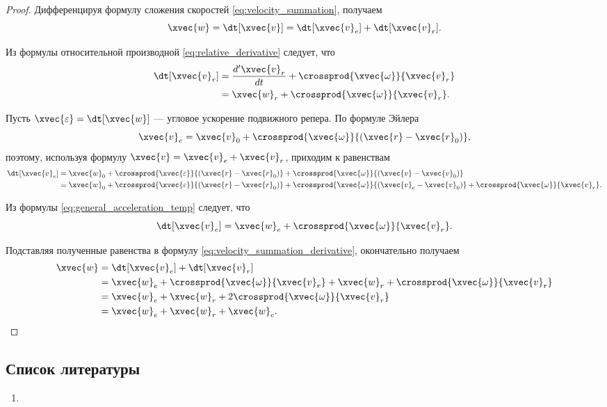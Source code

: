 \begin{proof}
  Дифференцируя формулу сложения скоростей \ref{eq:velocity_summation}, получаем
  \begin{equation}
    \label{eq:velocity_summation_derivative}
    \xvec{w} = \dt[\xvec{v}] = \dt[\xvec{v}_e] + \dt[\xvec{v}_r].
  \end{equation}

  Из формулы относительной производной \ref{eq:relative_derivative} следует, что
  \begin{equation*}
    \begin{aligned}
      \dt[\xvec{v}_r] &= \frac{d' \xvec{v}_r}{dt} +
        \crossprod{\xvec{\omega}}{\xvec{v}_r} \\
      &= \xvec{w}_r + \crossprod{\xvec{\omega}}{\xvec{v}_r}.
    \end{aligned}
  \end{equation*}

  Пусть $\xvec{\varepsilon} = \dt[\xvec{w}]$ --- угловое ускорение подвижного
  репера. По формуле Эйлера
  \begin{equation*}
    \xvec{v}_e = \xvec{v}_0
      + \crossprod
        {\xvec{\omega}}
        {(\xvec{r} - \xvec{r}_0)},
  \end{equation*}
  поэтому, используя формулу $\xvec{v} = \xvec{v}_e + \xvec{v}_r$, приходим к
  равенствам
  \begin{equation*}
    \begin{aligned}
      \dt[\xvec{v}_e] &= \xvec{w}_0
        + \crossprod{\xvec{\varepsilon}}{(\xvec{r} - \xvec{r}_0)}
        + \crossprod{\xvec{\omega}}{(\xvec{v} - \xvec{v}_0)} \\
      &= \xvec{w}_0
        + \crossprod{\xvec{\varepsilon}}{(\xvec{r} - \xvec{r}_0)}
        + \crossprod{\xvec{\omega}}{(\xvec{v}_e - \xvec{v}_0)}
        + \crossprod{\xvec{\omega}}{\xvec{v}_r}.
    \end{aligned}
  \end{equation*}

  Из формулы \ref{eq:general_acceleration_temp} следует, что
  \begin{equation*}
    \dt[\xvec{v}_e] = \xvec{w}_e + \crossprod{\xvec{\omega}}{\xvec{v}_r}.
  \end{equation*}

  Подставляя полученные равенства в формулу
  \ref{eq:velocity_summation_derivative}, окончательно получаем
  \begin{equation*}
    \begin{aligned}
      \xvec{w} &= \dt[\xvec{v}_e] + \dt[\xvec{v}_r] \\
      &= \xvec{w}_e + \crossprod{\xvec{\omega}}{\xvec{v}_r}
        + \xvec{w}_r + \crossprod{\xvec{\omega}}{\xvec{v}_r} \\
      &= \xvec{w}_e + \xvec{w}_r + 2 \crossprod{\xvec{\omega}}{\xvec{v}_r} \\
      &= \xvec{w}_e + \xvec{w}_r + \xvec{w}_c.
    \end{aligned}
  \end{equation*}
\end{proof}

\subsection{Список литературы}
\begin{enumerate}
  \item \cite{lectures}
\end{enumerate}

